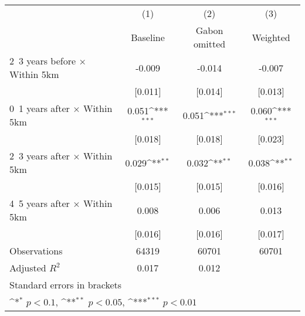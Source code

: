 {
\def\sym#1{\ifmmode^{#1}\else\(^{#1}\)\fi}
\begin{tabular}{l*{3}{c}}
\hline\hline
                    &\multicolumn{1}{c}{(1)}&\multicolumn{1}{c}{(2)}&\multicolumn{1}{c}{(3)}\\
                    &\multicolumn{1}{c}{Baseline}&\multicolumn{1}{c}{Gabon omitted}&\multicolumn{1}{c}{Weighted}\\
\hline
2~3 years before × Within 5km&      -0.009         &      -0.014         &      -0.007         \\
                    &     [0.011]         &     [0.014]         &     [0.013]         \\
0~1 years after × Within 5km&       0.051\sym{***}&       0.051\sym{***}&       0.060\sym{***}\\
                    &     [0.018]         &     [0.018]         &     [0.023]         \\
2~3 years after × Within 5km&       0.029\sym{**} &       0.032\sym{**} &       0.038\sym{**} \\
                    &     [0.015]         &     [0.015]         &     [0.016]         \\
4~5 years after × Within 5km&       0.008         &       0.006         &       0.013         \\
                    &     [0.016]         &     [0.016]         &     [0.017]         \\
\hline
Observations        &       64319         &       60701         &       60701         \\
Adjusted \(R^{2}\)  &       0.017         &       0.012         &                     \\
\hline\hline
\multicolumn{4}{l}{\footnotesize Standard errors in brackets}\\
\multicolumn{4}{l}{\footnotesize \sym{*} \(p<0.1\), \sym{**} \(p<0.05\), \sym{***} \(p<0.01\)}\\
\end{tabular}
}

